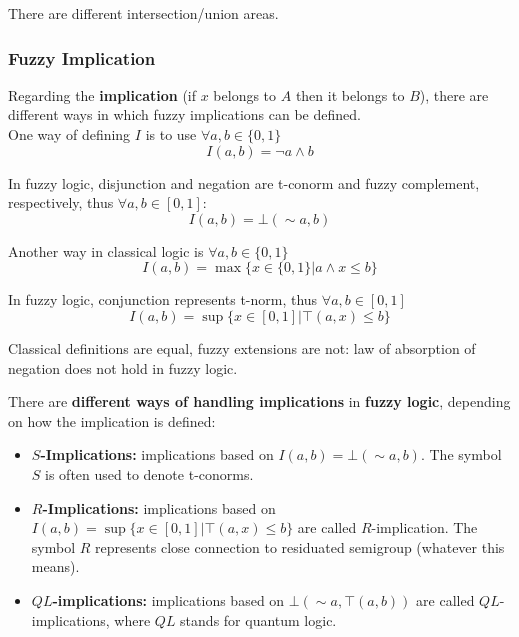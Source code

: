 There are different intersection/union areas.\\

\newpage

\subsubsection{Fuzzy Implication}

Regarding the \textbf{implication} (if $x$ belongs to $A$ then it belongs to $B$), there are different ways in which fuzzy implications can be defined.\\

One way of defining $I$ is to use $\forall a,b \in \{0,1\}$
$$ I (a,b) = \neg a \wedge b $$

In fuzzy logic, disjunction and negation are t-conorm and fuzzy complement, respectively, thus $\forall a,b \in [0,1]$:
$$ I(a,b) = \bot (\sim a,b) $$

Another way in classical logic is $\forall a,b \in \{0,1\}$
$$ I (a,b) = \max \{x \in \{0,1\} | a \wedge x \leq b \} $$

In fuzzy logic, conjunction represents t-norm, thus $\forall a,b \in [0,1]$
$$ I(a,b) = \sup \{x \in [0,1] | \top (a,x) \leq b \} $$

Classical definitions are equal, fuzzy extensions are not: law of absorption of negation does not hold in fuzzy logic.\\

\newpage

There are \textbf{different ways of handling implications} in \textbf{fuzzy logic}, depending on how the implication is defined:
\begin{itemize}
	\item \textbf{$S$-Implications:} implications based on $I(a,b) = \bot (\sim a,b)$. The symbol $S$ is often used to denote t-conorms.\\
	
	\item \textbf{$R$-Implications:} implications based on $I(a, b) = \sup \{x \in [0, 1]| \top (a, x) \leq b\}$ are called $R$-implication. The symbol $R$ represents close connection to residuated semigroup (whatever this means).\\
	
	\item \textbf{$QL$-implications:} implications based on $\bot (\sim a, \top(a, b))$ are called $QL$-implications, where $QL$ stands for quantum logic.\\
\end{itemize}

